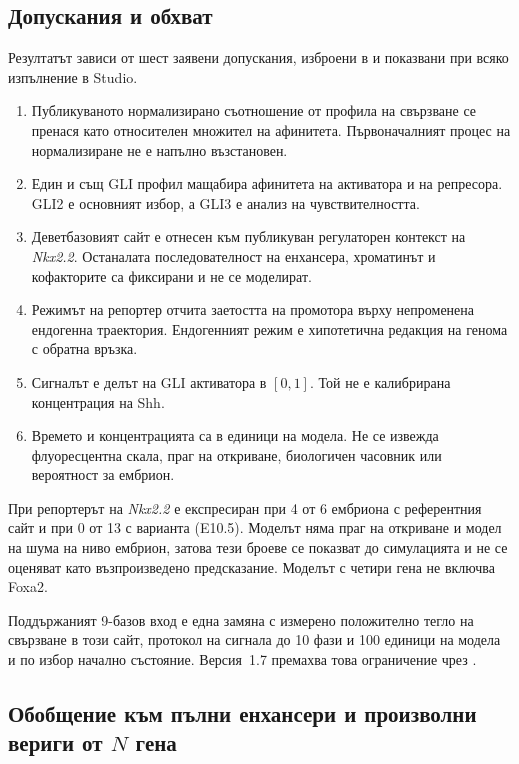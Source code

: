 \documentclass[10.5pt,a4paper]{article}
\begin{document}
\subsection{Допускания и обхват}\label{sec:assumptions}

Резултатът зависи от шест заявени допускания, изброени в  и показвани при всяко изпълнение в Studio.
\begin{enumerate}
\item Публикуваното нормализирано съотношение от профила на свързване се пренася като относителен множител на афинитета. Първоначалният процес на нормализиране не е напълно възстановен.
\item Един и същ GLI профил мащабира афинитета на активатора и на репресора. GLI2 е основният избор, а GLI3 е анализ на чувствителността.
\item Деветбазовият сайт е отнесен към публикуван регулаторен контекст на \emph{Nkx2.2}. Останалата последователност на енхансера, хроматинът и кофакторите са фиксирани и не се моделират.
\item Режимът на репортер отчита заетостта на промотора върху непроменена ендогенна траектория. Ендогенният режим е хипотетична редакция на генома с обратна връзка.
\item Сигналът е делът на GLI активатора в $[0,1]$. Той не е калибрирана концентрация на Shh.
\item Времето и концентрацията са в единици на модела. Не се извежда флуоресцентна скала, праг на откриване, биологичен часовник или вероятност за ембрион.
\end{enumerate}
При \citet{peterson2012} репортерът на \emph{Nkx2.2} е експресиран при 4 от 6 ембриона с референтния сайт и при 0 от 13 с варианта (E10.5). Моделът няма праг на откриване и модел на шума на ниво ембрион, затова тези броеве се показват до симулацията и не се оценяват като възпроизведено предсказание. Моделът с четири гена не включва Foxa2.

Поддържаният 9-базов вход е една замяна с измерено положително тегло на свързване в този сайт, протокол на сигнала до 10 фази и 100 единици на модела и по избор начално състояние. Версия~1.7 премахва това ограничение чрез .

\subsection{Обобщение към пълни енхансери и произволни вериги от $N$ гена}\label{sec:circuit}
\end{document}
